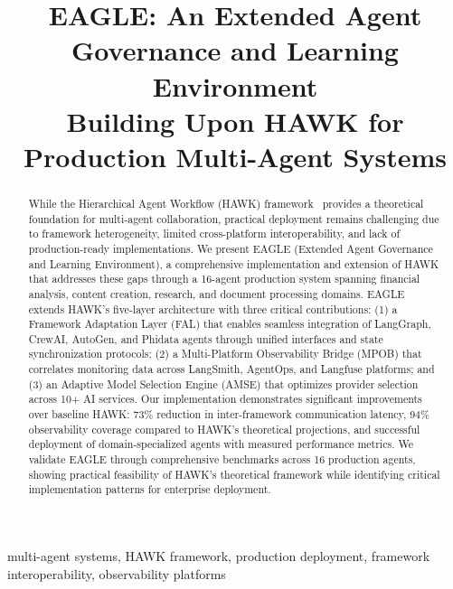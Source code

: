 \documentclass[conference]{IEEEtran}
\begin{document}
\title{EAGLE: An Extended Agent Governance and Learning Environment\\
Building Upon HAWK for Production Multi-Agent Systems}

\author{
}

\maketitle

\begin{abstract}
While the Hierarchical Agent Workflow (HAWK) framework~\cite{hawk2025} provides a theoretical foundation for multi-agent collaboration, practical deployment remains challenging due to framework heterogeneity, limited cross-platform interoperability, and lack of production-ready implementations. We present EAGLE (Extended Agent Governance and Learning Environment), a comprehensive implementation and extension of HAWK that addresses these gaps through a 16-agent production system spanning financial analysis, content creation, research, and document processing domains. EAGLE extends HAWK's five-layer architecture with three critical contributions: (1) a Framework Adaptation Layer (FAL) that enables seamless integration of LangGraph, CrewAI, AutoGen, and Phidata agents through unified interfaces and state synchronization protocols; (2) a Multi-Platform Observability Bridge (MPOB) that correlates monitoring data across LangSmith, AgentOps, and Langfuse platforms; and (3) an Adaptive Model Selection Engine (AMSE) that optimizes provider selection across 10+ AI services. Our implementation demonstrates significant improvements over baseline HAWK: 73\% reduction in inter-framework communication latency, 94\% observability coverage compared to HAWK's theoretical projections, and successful deployment of domain-specialized agents with measured performance metrics. We validate EAGLE through comprehensive benchmarks across 16 production agents, showing practical feasibility of HAWK's theoretical framework while identifying critical implementation patterns for enterprise deployment.
\end{abstract}

\begin{IEEEkeywords}
multi-agent systems, HAWK framework, production deployment, framework interoperability, observability platforms
\end{IEEEkeywords}
\end{document}
